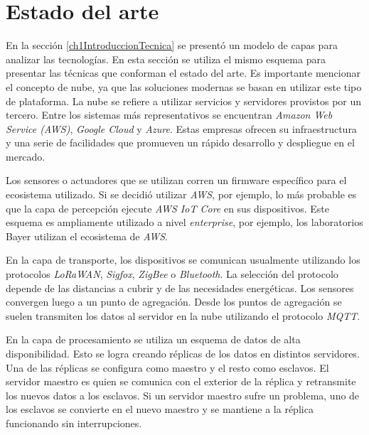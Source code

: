 \section{Estado del arte}
\label{ch1EstadoDelArte}

En la sección \ref{ch1IntroduccionTecnica} se presentó un modelo de capas para analizar las tecnologías.
En esta sección se utiliza el mismo esquema para presentar las técnicas que conforman el estado del arte.
Es importante mencionar el concepto de nube, ya que las soluciones modernas se basan en utilizar este tipo de plataforma.
La nube se refiere a utilizar servicios y servidores provistos por un tercero.
Entre los sistemas más representativos se encuentran \emph{Amazon Web Service (AWS)}, \emph{Google Cloud} y \emph{Azure}.
Estas empresas ofrecen su infraestructura y una serie de facilidades que promueven un rápido desarrollo y despliegue en el mercado.

Los sensores o actuadores que se utilizan corren un firmware específico para el ecosistema utilizado.
Si se decidió utilizar \emph{AWS}, por ejemplo, lo más probable es que la capa de percepción ejecute \emph{AWS IoT Core} en sus dispositivos.
Este esquema es ampliamente utilizado a nivel \emph{enterprise}, por ejemplo, los laboratorios Bayer utilizan el ecosistema de \emph{AWS}. \citep{WEBSITE:AWSBayer}

En la capa de transporte, los dispositivos se comunican usualmente utilizando los protocolos \emph{LoRaWAN}, \emph{Sigfox}, \emph{ZigBee} o \emph{Bluetooth}.
La selección del protocolo depende de las distancias a cubrir y de las necesidades energéticas.
Los sensores convergen luego a un punto de agregación.
Desde los puntos de agregación se suelen transmiten los datos al servidor en la nube utilizando el protocolo \emph{MQTT}.

En la capa de procesamiento se utiliza un esquema de datos de alta disponibilidad.
Esto se logra creando réplicas de los datos en distintos servidores.
Una de las réplicas se configura como maestro y el resto como esclavos.
El servidor maestro es quien se comunica con el exterior de la réplica y retransmite los nuevos datos a los esclavos.
Si un servidor maestro sufre un problema, uno de los esclavos se convierte en el nuevo maestro y se mantiene a la réplica funcionando sin interrupciones.

